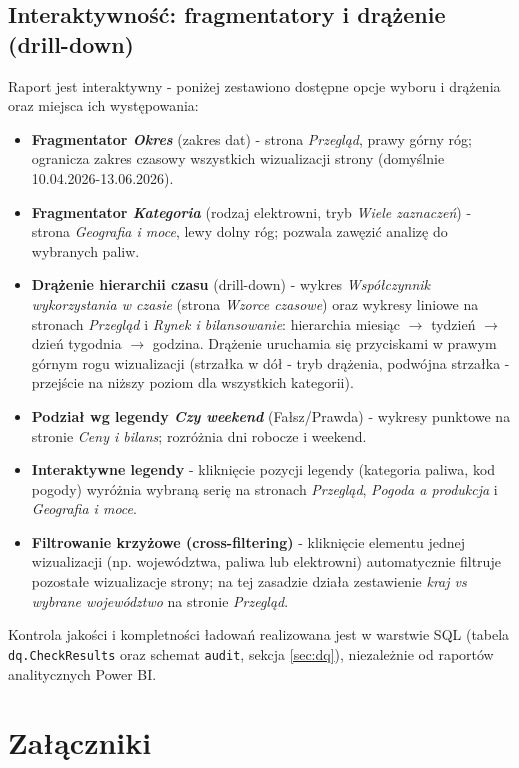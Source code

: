 \documentclass[12pt]{article}
\begin{document}
	\subsection{Interaktywność: fragmentatory i drążenie (drill-down)}
	Raport jest interaktywny - poniżej zestawiono dostępne opcje wyboru i drążenia oraz miejsca ich występowania:
	\begin{itemize}
		\item \textbf{Fragmentator \textit{Okres}} (zakres dat) - strona \textit{Przegląd}, prawy górny róg; ogranicza zakres czasowy wszystkich wizualizacji strony (domyślnie 10.04.2026-13.06.2026).
		\item \textbf{Fragmentator \textit{Kategoria}} (rodzaj elektrowni, tryb \textit{Wiele zaznaczeń}) - strona \textit{Geografia i moce}, lewy dolny róg; pozwala zawęzić analizę do wybranych paliw.
		\item \textbf{Drążenie hierarchii czasu} (drill-down) - wykres \textit{Współczynnik wykorzystania w czasie} (strona \textit{Wzorce czasowe}) oraz wykresy liniowe na stronach \textit{Przegląd} i \textit{Rynek i bilansowanie}: hierarchia miesiąc $\rightarrow$ tydzień $\rightarrow$ dzień tygodnia $\rightarrow$ godzina. Drążenie uruchamia się przyciskami w prawym górnym rogu wizualizacji (strzałka w dół - tryb drążenia, podwójna strzałka - przejście na niższy poziom dla wszystkich kategorii).
		\item \textbf{Podział wg legendy \textit{Czy weekend}} (Fałsz/Prawda) - wykresy punktowe na stronie \textit{Ceny i bilans}; rozróżnia dni robocze i weekend.
		\item \textbf{Interaktywne legendy} - kliknięcie pozycji legendy (kategoria paliwa, kod pogody) wyróżnia wybraną serię na stronach \textit{Przegląd}, \textit{Pogoda a produkcja} i \textit{Geografia i moce}.
		\item \textbf{Filtrowanie krzyżowe (cross-filtering)} - kliknięcie elementu jednej wizualizacji (np. województwa, paliwa lub elektrowni) automatycznie filtruje pozostałe wizualizacje strony; na tej zasadzie działa zestawienie \textit{kraj vs wybrane województwo} na stronie \textit{Przegląd}.
	\end{itemize}

	\medskip
	\noindent Kontrola jakości i kompletności ładowań realizowana jest w warstwie SQL (tabela \texttt{dq.CheckResults} oraz schemat \texttt{audit}, sekcja \ref{sec:dq}), niezależnie od raportów analitycznych Power BI.

	\section{Załączniki}
\end{document}
